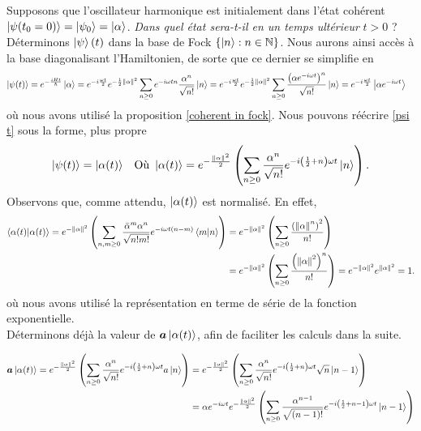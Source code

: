 \documentclass[11pt,oneside,a4paper]{article}
\newcommand{\h}{\ensuremath{\hbar}}
\begin{document}
Supposons que l'oscillateur harmonique est initialement dans l'état cohérent $\ket{\psi (t_0 = 0)} = \ket{\psi_0} = \ket{\alpha}$. \emph{Dans quel état sera-t-il en un temps ultérieur} $t>0$ ? Déterminons $\ket{\psi} (t)$ dans la base de Fock $\left\{\ket{n} : n\in\mathbb{N}\right\}$. Nous aurons ainsi accès à la base diagonalisant l'Hamiltonien, de sorte que ce dernier se simplifie en
\begin{align}
  \ket{\psi(t)} = e^{-\frac{iHt}{\h}}\ket{\alpha} &= e^{-i\frac{\omega t}{2}}e^{-\frac{1}{2}\norm{\alpha}^2}\sum_{n\geq 0}e^{-i\omega tn}\frac{\alpha^n}{\sqrt{n!}}\ket{n}
  = e^{-i\frac{\omega t}{2}}e^{-\frac{1}{2}\norm{\alpha}^2}\sum_{n\geq 0}\frac{\left(\alpha e^{-i\omega t}\right)^n}{\sqrt{n!}}\ket{n}
  = e^{-i\frac{\omega t}{2}}\ket{\alpha e^{-i\omega t}}\label{psi t}
\end{align}
où nous avons utilisé la proposition \eqref{coherent in fock}. Nous pouvons réécrire \eqref{psi t} sous la forme, plus propre
\begin{align*}
  \ket{\psi(t)} &= \ket{\alpha(t)} &\text{Où }\ket{\alpha(t)} = e^{-\frac{\norm{\alpha}^2}{2}}\left(\sum_{n\geq 0}\frac{\alpha^n}{\sqrt{n!}}e^{-i\left(\frac{1}{2}+n\right)\omega t}\ket{n}\right).
\end{align*}
Observons que, comme attendu, $\ket{\alpha(t)}$ est normalisé. En effet,
\begin{align*}
  \braket{\alpha(t)} = e^{-\norm{\alpha}^2}\left(\sum_{n,m\geq 0}\frac{\bar{\alpha}^m\alpha^n}{\sqrt{n!m!}}e^{-i\omega t\left(n-m\right)}\braket{m}{n}\right)
  &= e^{-\norm{\alpha}^2}\left(\sum_{n\geq 0}\frac{\left(\norm{\alpha}^n\right)^2}{n!}\right)\\
  &= e^{-\norm{\alpha}^2}\left(\sum_{n\geq 0}\frac{\left(\norm{\alpha}^2\right)^n}{n!}\right) = e^{-\norm{\alpha}^2}e^{\norm{\alpha}^2} = 1.
\end{align*}
où nous avons utilisé la représentation en terme de série de la fonction exponentielle.\\

Déterminons déjà la valeur de $\bm{a}\ket{\alpha(t)}$, afin de faciliter les calculs dans la suite. 

\begin{align*}
  \bm{a}\ket{\alpha(t)} = e^{-\frac{\norm{\alpha}^2}{2}}\left(\sum_{n\geq 0}\frac{\alpha^n}{\sqrt{n!}}e^{-i\left(\frac{1}{2}+n\right)\omega t}a\ket{n}\right)
  &= e^{-\frac{\norm{\alpha}^2}{2}}\left(\sum_{n\geq 0}\frac{\alpha^n}{\sqrt{n!}}e^{-i\left(\frac{1}{2}+n    \right)\omega t}\sqrt{n}\ket{n-1}\right)\\
  &= \alpha e^{-i\omega t}e^{-\frac{\norm{\alpha}^2}{2}}\left(\sum_{n\geq 0}\frac{\alpha^{n-1}}{\sqrt{(n-1)!}}e^{-i\left(\frac{1}{2}+n-1\right)\omega t}\ket{n-1}\right)
\end{align*}
\end{document}
